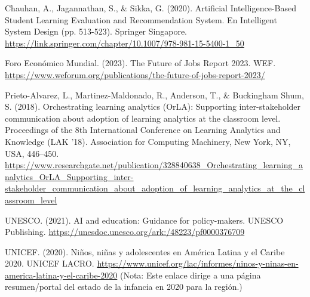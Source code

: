 
Chauhan, A., Jagannathan, S., \& Sikka, G. (2020). Artificial Intelligence-Based Student Learning Evaluation and Recommendation System. En Intelligent System Design (pp. 513-523). Springer Singapore. \url{https://link.springer.com/chapter/10.1007/978-981-15-5400-1_50}
\newline

Foro Económico Mundial. (2023). The Future of Jobs Report 2023. WEF. \url{https://www.weforum.org/publications/the-future-of-jobs-report-2023/}
\newline

Prieto-Alvarez, L., Martinez-Maldonado, R., Anderson, T., \& Buckingham Shum, S. (2018). Orchestrating learning analytics (OrLA): Supporting inter-stakeholder communication about adoption of learning analytics at the classroom level. Proceedings of the 8th International Conference on Learning Analytics and Knowledge (LAK '18). Association for Computing Machinery, New York, NY, USA, 446–450. \url{https://www.researchgate.net/publication/328840638_Orchestrating_learning_analytics_OrLA_Supporting_inter-stakeholder_communication_about_adoption_of_learning_analytics_at_the_classroom_level}
\newline

UNESCO. (2021). AI and education: Guidance for policy-makers. UNESCO Publishing. \url{https://unesdoc.unesco.org/ark:/48223/pf0000376709}
\newline

UNICEF. (2020). Niños, niñas y adolescentes en América Latina y el Caribe 2020. UNICEF LACRO. \url{https://www.unicef.org/lac/informes/ninos-y-ninas-en-america-latina-y-el-caribe-2020} (Nota: Este enlace dirige a una página resumen/portal del estado de la infancia en 2020 para la región.)